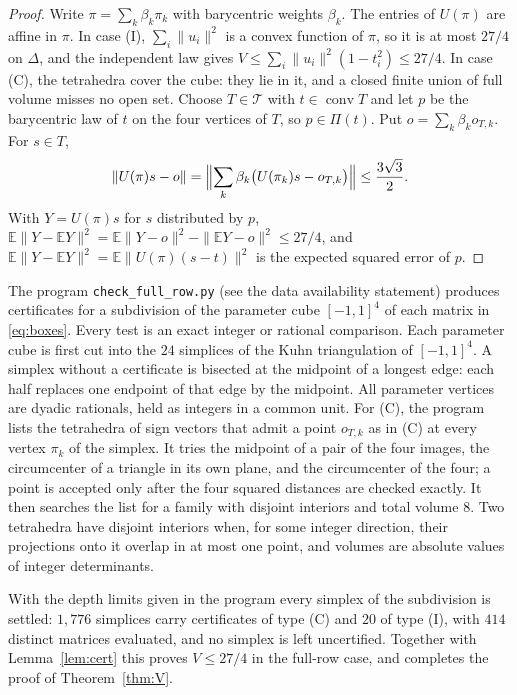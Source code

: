 \documentclass[11pt]{amsart}
\theoremstyle{remark}
\numberwithin{equation}{section}
\newcommand{\E}{\mathbb E}
\DeclareMathOperator{\conv}{conv}
\begin{document}
\begin{proof}
Write $\pi=\sum_k\beta_k\pi_k$ with barycentric weights $\beta_k$. The entries of $U(\pi)$ are affine in $\pi$. In case (I), $\sum_i\|u_i\|^2$ is a convex function of $\pi$, so it is at most $27/4$ on $\Delta$, and the independent law gives $V\le\sum_i\|u_i\|^2(1-t_i^2)\le27/4$. In case (C), the tetrahedra cover the cube: they lie in it, and a closed finite union of full volume misses no open set. Choose $T\in\mathcal T$ with $t\in\conv T$ and let $p$ be the barycentric law of $t$ on the four vertices of $T$, so $p\in\Pi(t)$. Put $o=\sum_k\beta_ko_{T,k}$. For $s\in T$,
\[
\|U(\pi)s-o\|=\Bigl\|\sum_k\beta_k\bigl(U(\pi_k)s-o_{T,k}\bigr)\Bigr\|\le\frac{3\sqrt3}2.
\]
With $Y=U(\pi)s$ for $s$ distributed by $p$, $\E\|Y-\E Y\|^2=\E\|Y-o\|^2-\|\E Y-o\|^2\le27/4$, and $\E\|Y-\E Y\|^2=\E\|U(\pi)(s-t)\|^2$ is the expected squared error of $p$.
\end{proof}

The program \texttt{check\_full\_row.py} (see the data availability statement) produces certificates for a subdivision of the parameter cube $[-1,1]^4$ of each matrix in \eqref{eq:boxes}. Every test is an exact integer or rational comparison. Each parameter cube is first cut into the $24$ simplices of the Kuhn triangulation \cite{Kuhn60} of $[-1,1]^4$. A simplex without a certificate is bisected at the midpoint of a longest edge: each half replaces one endpoint of that edge by the midpoint. All parameter vertices are dyadic rationals, held as integers in a common unit. For (C), the program lists the tetrahedra of sign vectors that admit a point $o_{T,k}$ as in (C) at every vertex $\pi_k$ of the simplex. It tries the midpoint of a pair of the four images, the circumcenter of a triangle in its own plane, and the circumcenter of the four; a point is accepted only after the four squared distances are checked exactly. It then searches the list for a family with disjoint interiors and total volume $8$. Two tetrahedra have disjoint interiors when, for some integer direction, their projections onto it overlap in at most one point, and volumes are absolute values of integer determinants.

With the depth limits given in the program every simplex of the subdivision is settled: $1{,}776$ simplices carry certificates of type (C) and $20$ of type (I), with $414$ distinct matrices evaluated, and no simplex is left uncertified. Together with Lemma~\ref{lem:cert} this proves $V\le27/4$ in the full-row case, and completes the proof of Theorem~\ref{thm:V}.
\end{document}
